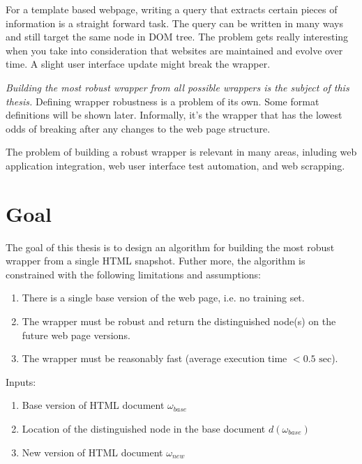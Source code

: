For a template based webpage, writing a query that extracts certain pieces of information is a straight forward task. The query can be written in many ways and still target the same node in DOM tree. The problem gets really interesting when you take into consideration that websites are maintained and evolve over time. A slight user interface update might break the wrapper.

\textit{Building the most robust wrapper from all possible wrappers is the subject of this thesis.} Defining wrapper robustness is a problem of its own. Some format definitions will be shown later. Informally, it's the wrapper that has the lowest odds of breaking after any changes to the web page structure.

The problem of building a robust wrapper is relevant in many areas, inluding web application integration, web user interface test automation, and web scrapping.


\section{Goal}


The goal of this thesis is to design an algorithm for building the most robust wrapper from a single HTML snapshot. Futher more, the algorithm is constrained with the following limitations and assumptions:

\begin{enumerate}
	\item There is a single base version of the web page, i.e. no training set.
	\item The wrapper must be robust and return the distinguished node(s) on the future web page versions.
	\item The wrapper must be reasonably fast (average execution time $<0.5\text{ sec}$).
\end{enumerate}

Inputs: 

\begin{enumerate}
	\item Base version of HTML document $\omega_{base}$
	\item Location of the distinguished node in the base document $d(\omega_{base})$
	\item New version of HTML document $\omega_{new}$
\end{enumerate}

